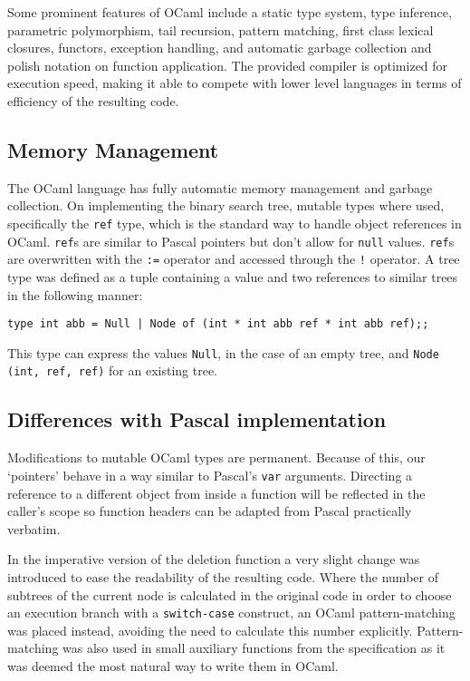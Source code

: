 \documentclass[11pt]{scrartcl} %
\begin{document}
Some prominent features of OCaml include a static type system, type inference, parametric polymorphism, tail recursion, pattern matching, first class lexical closures, functors, exception handling, and automatic garbage collection and polish notation on function application. The provided compiler is optimized for execution speed, making it able to compete with lower level languages in terms of efficiency of the resulting code.

\subsection*{Memory Management}

The OCaml language has fully automatic memory management and garbage collection. On implementing the binary search tree, mutable types where used, specifically the \texttt{ref} type, which is the standard way to handle object references in OCaml. \texttt{ref}s are similar to Pascal pointers but don't allow for \texttt{null} values. \texttt{ref}s are overwritten with the \texttt{:=} operator and accessed through the \texttt{!} operator. A tree type was defined as a tuple containing a value and two references to similar trees in the following manner:

\texttt{type int abb = Null | Node of (int * int abb ref * int abb ref);;} 

This type can express the values \texttt{Null}, in the case of an empty tree, and \texttt{Node (int, ref, ref)} for an existing tree.

\subsection*{Differences with Pascal implementation}

Modifications to mutable OCaml types are permanent. Because of this, our `pointers' behave in a way similar to Pascal's \texttt{var} arguments. Directing a reference to a different object from inside a function will be reflected in the caller's scope so function headers can be adapted from Pascal practically verbatim.

In the imperative version of the deletion function a very slight change was introduced to ease the readability of the resulting code. Where the number of subtrees of the current node is calculated in the original code in order to choose an execution branch with a \texttt{switch-case} construct, an OCaml pattern-matching was placed instead, avoiding the need to calculate this number explicitly. Pattern-matching was also used in small auxiliary functions from the specification as it was deemed the most natural way to write them in OCaml.
\end{document}
